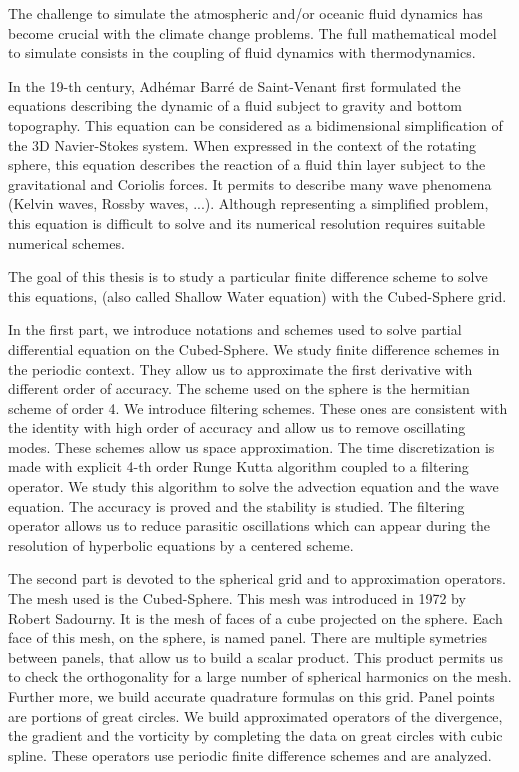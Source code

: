   
  \begin{EnglishAbstract}
The challenge to simulate the atmospheric and/or oceanic fluid dynamics has become crucial with the climate change problems. The full mathematical model to simulate consists in the coupling of fluid dynamics with thermodynamics.
  
In the 19-th century, Adhémar Barré de Saint-Venant first formulated the equations describing the dynamic of a fluid subject to gravity and bottom topography. This equation can be considered as a bidimensional simplification of the 3D Navier-Stokes system. When expressed in the context of the rotating sphere, this equation describes the reaction of a fluid thin layer subject to the gravitational and Coriolis forces. It permits to describe many wave phenomena (Kelvin waves, Rossby waves, ...). Although representing a simplified problem, this equation is difficult to solve and its numerical resolution requires suitable numerical schemes.

The goal of this thesis is to study a particular finite difference scheme to solve this equations, (also called  Shallow Water equation) with the Cubed-Sphere grid. 

In the first part, we introduce notations and schemes used to solve partial differential equation on the Cubed-Sphere. We study finite difference schemes in the periodic context. They allow us to approximate the first derivative with different order of accuracy. The scheme used on the sphere is the hermitian scheme of order 4. We introduce filtering schemes. These ones are consistent with the identity with high order of accuracy and allow us to remove oscillating modes. These schemes allow us space approximation. The time discretization is made with explicit 4-th order Runge Kutta algorithm coupled to a filtering operator. We study this algorithm to solve the advection equation and the wave equation. The accuracy is proved and the stability is studied. The filtering operator allows us to reduce parasitic oscillations which can appear during the resolution of hyperbolic equations by a centered scheme.

The second part is devoted to the spherical grid and to approximation operators. The mesh used is the Cubed-Sphere. This mesh was introduced in 1972 by Robert Sadourny. It is the mesh of faces of a cube projected on the sphere. Each face of this mesh, on the sphere, is named panel. There are multiple symetries between panels, that allow us to build a scalar product. This product permits us to check the orthogonality for a large number of spherical harmonics on the mesh. Further more, we build accurate quadrature formulas on this grid. Panel points are portions of great circles. We build approximated operators of the divergence, the gradient and the vorticity by completing the data on great circles with cubic spline. These operators use periodic finite difference schemes and are analyzed.


\end{EnglishAbstract}
